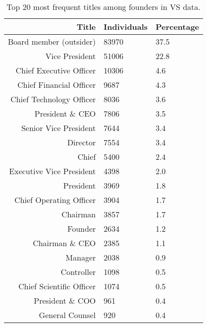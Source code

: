 \begin{table}[!htb]
\centering
\begingroup\footnotesize
\begin{tabular}{rll}
  \toprule
Title & Individuals & Percentage \\ 
  \midrule
Board member (outsider) & 83970 & 37.5 \\ 
  Vice President & 51006 & 22.8 \\ 
  Chief Executive Officer & 10306 & 4.6 \\ 
  Chief Financial Officer & 9687 & 4.3 \\ 
  Chief Technology Officer & 8036 & 3.6 \\ 
  President \& CEO & 7806 & 3.5 \\ 
  Senior Vice President & 7644 & 3.4 \\ 
  Director & 7554 & 3.4 \\ 
  Chief & 5400 & 2.4 \\ 
  Executive Vice President & 4398 & 2.0 \\ 
  President & 3969 & 1.8 \\ 
  Chief Operating Officer & 3904 & 1.7 \\ 
  Chairman & 3857 & 1.7 \\ 
  Founder & 2634 & 1.2 \\ 
  Chairman \& CEO & 2385 & 1.1 \\ 
  Manager & 2038 & 0.9 \\ 
  Controller & 1098 & 0.5 \\ 
  Chief Scientific Officer & 1074 & 0.5 \\ 
  President \& COO & 961 & 0.4 \\ 
  General Counsel & 920 & 0.4 \\ 
   \bottomrule
\end{tabular}
\endgroup
\caption{Top 20 most frequent titles among founders in VS data.} 
\label{table:VS_titlesSummaryTable}
\end{table}

